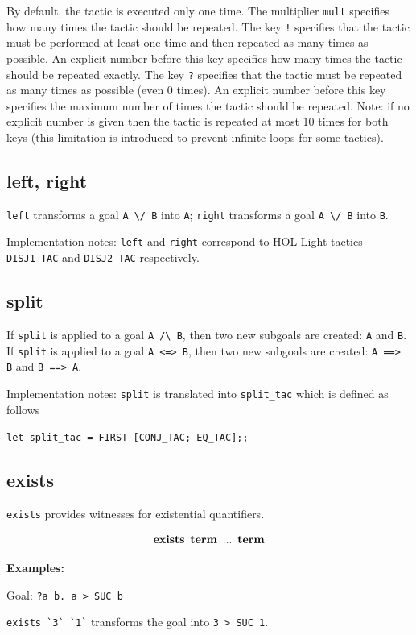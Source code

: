 \documentclass[a4paper]{article}
\newcommand{\xx}[1]{\mathop{\text{\bf #1}}}
\begin{document}
By default, the tactic is executed only one time. The multiplier \verb|mult| specifies how many times the tactic should be repeated. The key \verb|!| specifies that the tactic must be performed at least one time and then repeated as many times as possible. An explicit number before this key specifies how many times the tactic should be repeated exactly. The key \verb|?| specifies that the tactic must be repeated as many times as possible (even 0 times). An explicit number before this key specifies the maximum number of times the tactic should be repeated. Note: if no explicit number is given then the tactic is repeated at most 10 times for both keys (this limitation is introduced to prevent infinite loops for some tactics).

\subsection{left, right}
\verb|left| transforms a goal \verb|A \/ B| into \verb|A|; \verb|right| transforms a goal \verb|A \/ B| into \verb|B|.

Implementation notes: \verb|left| and \verb|right| correspond to HOL Light tactics \verb|DISJ1_TAC| and \verb|DISJ2_TAC| respectively.

\subsection{split}
If \verb|split| is applied to a goal \verb|A /\ B|, then two new subgoals are created: \verb|A| and \verb|B|. If \verb|split| is applied to a goal \verb|A <=> B|, then two new subgoals are created: \verb|A ==> B| and \verb|B ==> A|.

Implementation notes: \verb|split| is translated into \verb|split_tac| which is defined as follows

\verb|let split_tac = FIRST [CONJ_TAC; EQ_TAC];;|


\subsection{exists}
\verb|exists| provides witnesses for existential quantifiers.

$$\xx{exists}\ \xx{term}\ ...\ \xx{term}$$

{\bf Examples:}

Goal: \verb|?a b. a > SUC b|

\verb|exists `3` `1`| transforms the goal into \verb|3 > SUC 1|.
\end{document}
